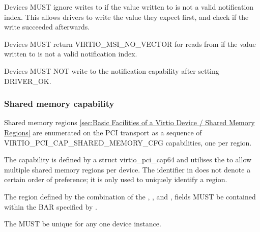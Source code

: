 
Devices MUST ignore writes to  if
the value written to  is not a valid
notification index. This allows drivers to write the value they expect first,
and check if the write succeeded afterwards.

Devices MUST return VIRTIO_MSI_NO_VECTOR for reads from
 if the value written to
 is not a valid notification index.

Devices MUST NOT write to the notification capability after setting DRIVER_OK.

\subsubsection{Shared memory capability}\label{sec:Virtio Transport Options / Virtio Over PCI Bus / PCI Device Layout / Shared memory capability}

Shared memory regions \ref{sec:Basic Facilities of a Virtio
Device / Shared Memory Regions} are enumerated on the PCI transport
as a sequence of VIRTIO_PCI_CAP_SHARED_MEMORY_CFG capabilities, one per region.

The capability is defined by a struct virtio_pci_cap64 and
utilises the  to allow multiple shared memory
regions per device.
The identifier in  does not denote a certain order of
preference; it is only used to uniquely identify a region.


The region defined by the combination of the ,
, and , 
fields MUST be contained within the BAR specified by
.

The  MUST be unique for any one device instance.

